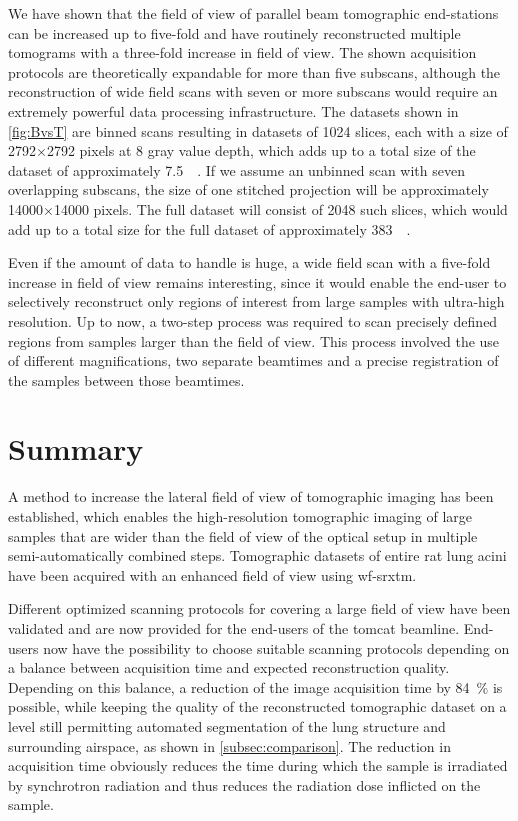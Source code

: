 We have shown that the field of view of parallel beam tomographic end-stations can be increased up to five-fold and have routinely reconstructed multiple tomograms with a three-fold increase in field of view. The shown acquisition protocols are theoretically expandable for more than five subscans, although the reconstruction of wide field scans with seven or more subscans would require an extremely powerful data processing infrastructure. The datasets shown in \autoref{fig:BvsT} are binned scans resulting in datasets of 1024 slices, each with a size of 2792$\times$2792 pixels at \SI{8}{\bit} gray value depth, which adds up to a total size of the dataset of approximately \SI{7.5}{\giga\byte}. If we assume an unbinned scan with seven overlapping subscans, the size of one stitched projection will be approximately 14000$\times$14000 pixels. The full dataset will consist of 2048 such slices, which would add up to a total size for the full dataset of approximately \SI{383}{\giga\byte}.

Even if the amount of data to handle is huge, a wide field scan with a five-fold increase in field of view remains interesting, since it would enable the end-user to selectively reconstruct only regions of interest from large samples with ultra-high resolution. Up to now, a two-step process was required to scan precisely defined regions from samples larger than the field of view. This process involved the use of different magnifications, two separate beamtimes and a precise registration of the samples between those beamtimes.

\section{Summary}\label{summary}
A method to increase the lateral field of view of tomographic imaging has been established, which enables the high-resolution tomographic imaging of large samples that are wider than the field of view of the optical setup in multiple semi-automatically combined steps. Tomographic datasets of entire rat lung acini have been acquired with an enhanced field of view using \ac{wf-srxtm}.

Different optimized scanning protocols for covering a large field of view have been validated and are now provided for the end-users of the \ac{tomcat} beamline. End-users now have the possibility to choose suitable scanning protocols depending on a balance between acquisition time and expected reconstruction quality. Depending on this balance, a reduction of the image acquisition time by \SI{84}{\percent} is possible, while keeping the quality of the reconstructed tomographic dataset on a level still permitting automated segmentation of the lung structure and surrounding airspace, as shown in \autoref{subsec:comparison}. The reduction in acquisition time obviously reduces the time during which the sample is irradiated by synchrotron radiation and thus reduces the radiation dose inflicted on the sample.

